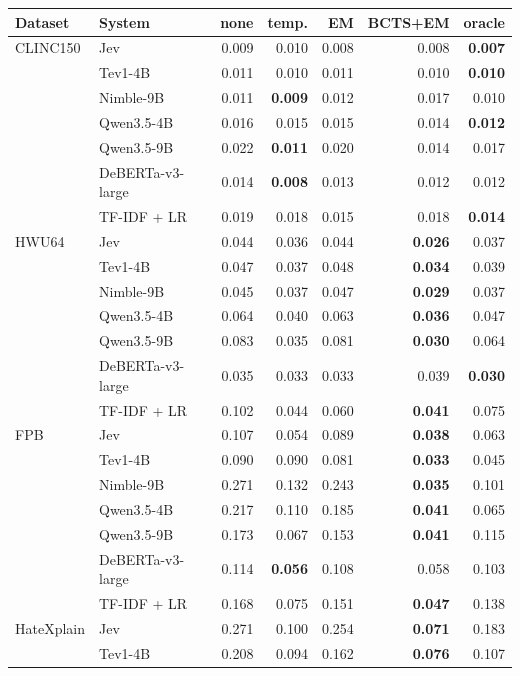\begin{tabular}{llrrrrr}
\toprule
Dataset & System & none & temp. & EM & BCTS+EM & oracle \\
\midrule
CLINC150 & Jev & 0.009 & 0.010 & 0.008 & 0.008 & \textbf{0.007} \\
 & Tev1-4B & 0.011 & 0.010 & 0.011 & 0.010 & \textbf{0.010} \\
 & Nimble-9B & 0.011 & \textbf{0.009} & 0.012 & 0.017 & 0.010 \\
 & Qwen3.5-4B & 0.016 & 0.015 & 0.015 & 0.014 & \textbf{0.012} \\
 & Qwen3.5-9B & 0.022 & \textbf{0.011} & 0.020 & 0.014 & 0.017 \\
 & DeBERTa-v3-large & 0.014 & \textbf{0.008} & 0.013 & 0.012 & 0.012 \\
 & TF-IDF + LR & 0.019 & 0.018 & 0.015 & 0.018 & \textbf{0.014} \\
\midrule
HWU64 & Jev & 0.044 & 0.036 & 0.044 & \textbf{0.026} & 0.037 \\
 & Tev1-4B & 0.047 & 0.037 & 0.048 & \textbf{0.034} & 0.039 \\
 & Nimble-9B & 0.045 & 0.037 & 0.047 & \textbf{0.029} & 0.037 \\
 & Qwen3.5-4B & 0.064 & 0.040 & 0.063 & \textbf{0.036} & 0.047 \\
 & Qwen3.5-9B & 0.083 & 0.035 & 0.081 & \textbf{0.030} & 0.064 \\
 & DeBERTa-v3-large & 0.035 & 0.033 & 0.033 & 0.039 & \textbf{0.030} \\
 & TF-IDF + LR & 0.102 & 0.044 & 0.060 & \textbf{0.041} & 0.075 \\
\midrule
FPB & Jev & 0.107 & 0.054 & 0.089 & \textbf{0.038} & 0.063 \\
 & Tev1-4B & 0.090 & 0.090 & 0.081 & \textbf{0.033} & 0.045 \\
 & Nimble-9B & 0.271 & 0.132 & 0.243 & \textbf{0.035} & 0.101 \\
 & Qwen3.5-4B & 0.217 & 0.110 & 0.185 & \textbf{0.041} & 0.065 \\
 & Qwen3.5-9B & 0.173 & 0.067 & 0.153 & \textbf{0.041} & 0.115 \\
 & DeBERTa-v3-large & 0.114 & \textbf{0.056} & 0.108 & 0.058 & 0.103 \\
 & TF-IDF + LR & 0.168 & 0.075 & 0.151 & \textbf{0.047} & 0.138 \\
\midrule
HateXplain & Jev & 0.271 & 0.100 & 0.254 & \textbf{0.071} & 0.183 \\
 & Tev1-4B & 0.208 & 0.094 & 0.162 & \textbf{0.076} & 0.107 \\

\end{tabular}
